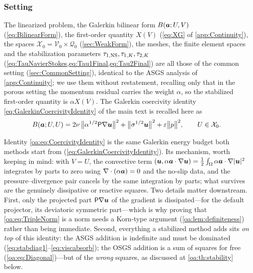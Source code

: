 \subsubsection{Setting}
\label{oa:sec:continuous}

The linearized problem, the Galerkin bilinear form $B(\boldsymbol{a};U,V)$ (\cref{eq:BilinearForm}), the
first{\hyp}order quantity $X(V)$ (\cref{eq:XG} of \cref{app:Continuity}), the spaces $\mathcal{X}_0 = \mathcal{V}_0\times\mathcal{Q}_0$
(\cref{sec:WeakForm}), the meshes, the finite element spaces and the stabilization parameters
$\tau_{1,\mathrm{NS}}, \tau_{1,K}, \tau_{2,K}$ (\cref{eq:TauNavierStokes,eq:Tau1Final,eq:Tau2Final}) are all those of the
common setting (\cref{sec:CommonSetting}), identical to the ASGS analysis of \cref{app:Continuity}; we use
them without restatement, recalling only that in the porous setting the momentum residual carries the
weight $\alpha$, so the stabilized first{\hyp}order quantity is $\alpha X(V)$. The Galerkin coercivity
identity \cref{eq:GalerkinCoercivityIdentity} of the main text is recalled here as
\begin{equation}
  \label{oa:eq:CoercivityIdentity}
  B(\boldsymbol{a}; U, U)
  = 2\nu\,\bigl\lVert \alpha^{1/2}\mathsf{P}\nabla\boldsymbol{u} \bigr\rVert^2
  + \bigl\lVert\sigma^{1/2}\boldsymbol{u}\bigr\rVert^2
  + \varepsilon\bigl\lVert p\bigr\rVert^2 ,
  \qquad U \in \mathcal{X}_0 .
\end{equation}

\begin{pedagogy}
Identity \cref{oa:eq:CoercivityIdentity} is the same Galerkin energy budget both
methods start from (\cref{eq:GalerkinCoercivityIdentity}). Its mechanism, worth
keeping in mind: with $V = U$, the convective term
$(\boldsymbol{u}, \alpha\boldsymbol{a}\cdot\nabla\boldsymbol{u}) = \tfrac12\int_\Omega \alpha\boldsymbol{a}\cdot\nabla|\boldsymbol{u}|^2$
integrates by parts to zero using $\nabla\cdot(\alpha\boldsymbol{a}) = 0$ and the no-slip
data, and the pressure--divergence pair cancels by the same integration by
parts; what survives are the genuinely dissipative or reactive squares. Two
details matter downstream. First, only the projected part
$\mathsf{P}\nabla\boldsymbol{u}$ of the gradient is dissipated---for the default projector, its
deviatoric symmetric part---which is why proving that
\cref{oa:eq:TripleNorm} is a norm needs a Korn-type argument
(\cref{oa:lem:definiteness}) rather than being immediate. Second, everything a
stabilized method adds sits \emph{on top} of this identity: the ASGS addition is
indefinite and must be dominated (\cref{eq:stabdiag1}--\cref{eq:viscabsorb}); the
OSGS addition is a sum of squares for free (\cref{oa:eq:Diagonal})---but of the
\emph{wrong} squares, as discussed at \cref{oa:th:stability} below.
\end{pedagogy}

